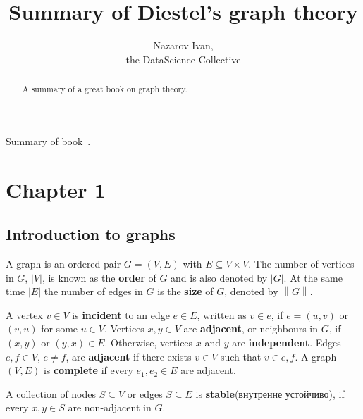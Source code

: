 \documentclass[a4paper]{article}
\title{Summary of Diestel's graph theory}
\author{Nazarov Ivan, \rus{101мНОД(ИССА)}\\the DataScience Collective}
\newcommand{\abs}[1]{{\left | #1 \right |}}
\newcommand{\nrm}[1]{{\left\| #1 \right \|}}
\newcommand{\rus}[1]{\foreignlanguage{russian}{#1}}
\begin{document}
\maketitle

\begin{abstract}
	A summary of a great book on graph theory.
\end{abstract}

\tableofcontents
\clearpage

Summary of book~\cite{diestel2006}.

\section{Chapter 1} %
\label{sec:chapter_1}

\subsection{Introduction to graphs} %
\label{sub:introduction_to_graphs}

A graph is an ordered pair $G=(V,E)$ with $E\subseteq V\times V$.
The number of vertices in $G$, $\abs{V}$, is known as the \textbf{order} of $G$ and is also denoted by $\abs{G}$.
At the same time $\abs{E}$ the number of edges in $G$ is the \textbf{size} of $G$, denoted by $\nrm{G}$.

A vertex $v\in V$ is \textbf{incident} to an edge $e\in E$, written as $v\in e$, if $e=(u,v)$ or $(v,u)$ for some $u\in V$.
Vertices $x,y\in V$ are \textbf{adjacent}, or neighbours in $G$, if $(x,y)$ or $(y,x)\in E$. Otherwise, vertices $x$ and $y$ are \textbf{independent}.
Edges $e,f\in V$, $e\neq f$, are \textbf{adjacent} if there exists $v\in V$ such that $v\in e,f$.
A graph $(V,E)$ is \textbf{complete} if every $e_1, e_2\in E$ are adjacent.

A collection of nodes $S\subseteq V$ or edges $S\subseteq E$ is \textbf{stable}(\rus{внутренне устойчиво}), if every $x,y\in S$ are non-adjacent in $G$.










\end{document}

